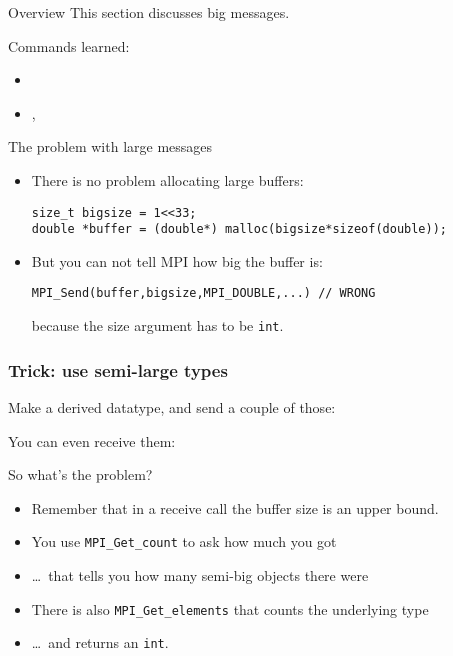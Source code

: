 
\begin{frame}[containsverbatim]{Overview}
  This section discusses big messages.

  Commands learned:
  \begin{itemize}
  \item {}
  \item {},
  \end{itemize}
\end{frame}

\begin{frame}[containsverbatim]{The problem with large messages}
  \begin{itemize}
  \item There is no problem allocating large buffers:
\begin{lstlisting}
size_t bigsize = 1<<33;
double *buffer = (double*) malloc(bigsize*sizeof(double));
\end{lstlisting}
\item But you can not tell MPI how big the buffer is:
\begin{lstlisting}
MPI_Send(buffer,bigsize,MPI_DOUBLE,...) // WRONG
\end{lstlisting}
because the size argument has to be \lstinline{int}.
  \end{itemize}
\end{frame}

\begin{frame}[containsverbatim]\frametitle{Trick: use semi-large types}
  Make a derived datatype, and send a couple of those:
  

  You can even receive them:

\end{frame}

\begin{frame}[containsverbatim]{So what's the problem?}
  \begin{itemize}
  \item Remember that in a receive call the buffer size is an upper bound.
  \item You use \lstinline{MPI_Get_count} to ask how much you got
  \item \ldots~that tells you how many semi-big objects there were
  \item There is also \lstinline{MPI_Get_elements} that counts the underlying type
  \item \ldots~and returns an \lstinline{int}.
  \end{itemize}
\end{frame}

